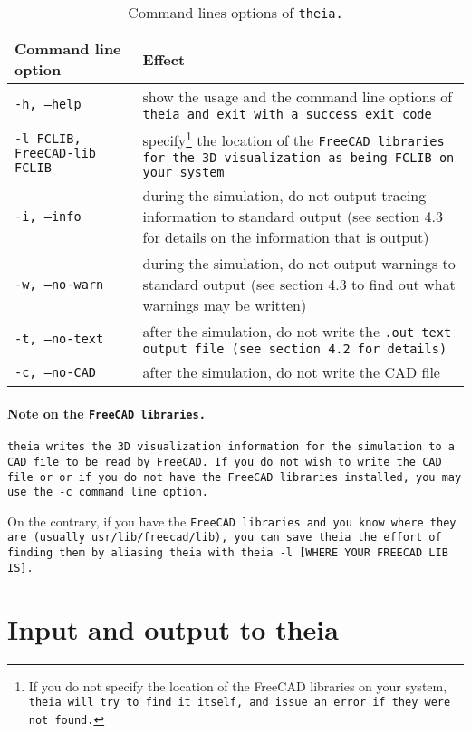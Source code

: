 \documentclass{article}
\begin{document}
\begin{table}[h]
\begin{center}
\begin{tabular}{| p{4cm} | p{10cm} |}
\hline
\textbf{Command line option} & \textbf{Effect} \\
\hline \hline
\tt{-h, --help} & show the usage and the command line options of \tt{theia} and exit with a success exit code\\
\hline
\tt{-l FCLIB, --FreeCAD-lib FCLIB} & specify\footnote{If you do not specify the location of the FreeCAD libraries on your system, \tt{theia} will try to find it itself, and issue an error if they were not found.} the location of the \tt{FreeCAD} libraries for the 3D visualization as being \tt{FCLIB} on your system\\
\hline
\tt{-i, --info} & during the simulation, do not output tracing information to standard output (see section 4.3 for details on the information that is output)\\
\hline
\tt{-w, --no-warn} & during the simulation, do not output warnings to standard output (see section 4.3 to find out what warnings may be written)\\
\hline
\tt{-t, --no-text} & after the simulation, do not write the \tt{.out} text output file (see section 4.2 for details)\\
\hline
\tt{-c, --no-CAD} & after the simulation, do not write the CAD file\\
\hline
\end{tabular}
\end{center}
\caption{Command lines options of \tt{theia}.}
\label{option}
\end{table}

\paragraph{Note on the \tt{FreeCAD} libraries.}\tt{theia} writes the 3D visualization information for the simulation to a CAD file to be read by \tt{FreeCAD}. If you do not wish to write the CAD file or or if you do not have the \tt{FreeCAD} libraries installed, you may use the \tt{-c} command line option.

On the contrary, if you have the \tt{FreeCAD} libraries and you know where they are (usually \tt{usr/lib/freecad/lib}), you can save \tt{theia} the effort of finding them by aliasing \tt{theia} with \tt{theia -l [WHERE YOUR FREECAD LIB IS]}.


\section{Input and output to theia}
\end{document}
